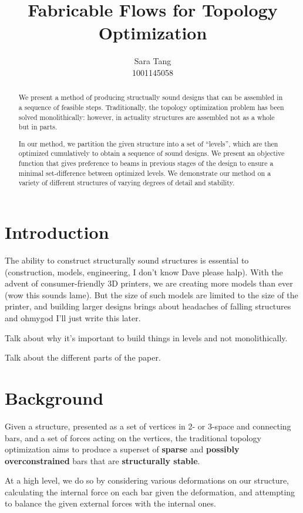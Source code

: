 \documentclass[11pt]{article}
\title{Fabricable Flows for Topology Optimization} \author{Sara Tang\\ 1001145058}
\theoremstyle{definition}
\begin{document}
\maketitle

\begin{abstract}
  We present a method of producing structually sound designs that can be
  assembled in a sequence of feasible steps. Traditionally, the topology
  optimization problem has been solved monolithically: however, in actuality
  structures are assembled not as a whole but in parts.

  In our method, we partition the given structure into a set of ``levels'',
  which are then optimized cumulatively to obtain a sequence of sound
  designs. We present an objective function that gives preference to beams in
  previous stages of the design to ensure a minimal set-difference between
  optimized levels. We demonstrate our method on a variety of different
  structures of varying degrees of detail and stability.
\end{abstract}

\section{Introduction}
The ability to construct structurally sound structures is essential to
(construction, models, engineering, I don't know Dave please halp). With the
advent of consumer-friendly 3D printers, we are creating more models than ever
(wow this sounds lame). But the size of such models are limited to the size of
the printer, and building larger designs brings about headaches of falling
structures and ohmygod I'll just write this later.

Talk about why it's important to build things in levels and not monolithically.

Talk about the different parts of the paper.

\section{Background}
Given a structure, presented as a set of vertices in 2- or 3-space and connecting
bars, and a set of forces acting on the vertices, the traditional topology
optimization aims to produce a superset of \textbf{sparse} and \textbf{possibly
overconstrained} bars that are \textbf{structurally stable}. 

At a high level, we do so by considering various deformations on our structure,
calculating the internal force on each bar given the deformation, and
attempting to balance the given external forces with the internal ones.
\end{document}
